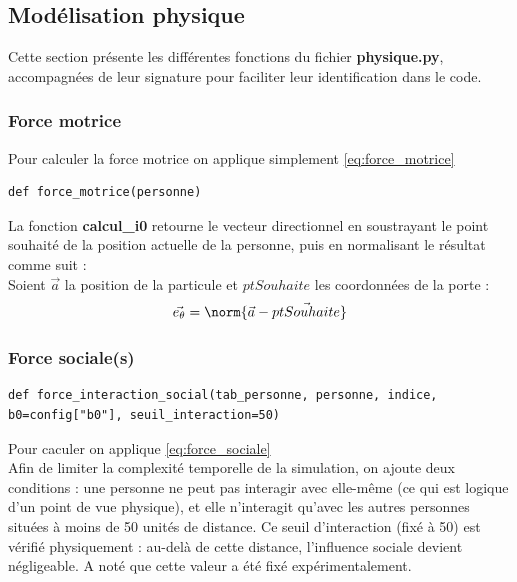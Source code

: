 \documentclass[a4paper,12pt]{article}
\begin{document}
\subsection{Modélisation physique}
Cette section présente les différentes fonctions du fichier \textbf{physique.py}, accompagnées de leur signature pour faciliter leur identification dans le code.
\subsubsection{Force motrice}

Pour calculer la force motrice on applique simplement \eqref{eq:force_motrice}

\begin{verbatim}
def force_motrice(personne)
\end{verbatim}

La fonction \textbf{calcul\_i0} retourne le vecteur directionnel en soustrayant le point souhaité de la position actuelle de la personne, puis en normalisant le résultat comme suit :
\\
\indent Soient $\vec{a}$ la position de la particule et $ptSouhaite$ les coordonnées de la porte :
\begin{equation}
	\vec{e_\theta} = \norm{\vec{a} - \vec{ptSouhaite}}
\end{equation}


\subsubsection{Force sociale(s)}


\begin{verbatim}
def force_interaction_social(tab_personne, personne, indice, b0=config["b0"], seuil_interaction=50)
\end{verbatim}

Pour caculer on applique \eqref{eq:force_sociale}
\\

Afin de limiter la complexité temporelle de la simulation, on ajoute deux conditions : une personne ne peut pas interagir avec elle-même (ce qui est logique d’un point de vue physique), et elle n’interagit qu’avec les autres personnes situées à moins de 50 unités de distance.  Ce seuil d’interaction (fixé à 50) est vérifié physiquement : au-delà de cette distance, l’influence sociale devient négligeable. A noté que cette valeur a été fixé expérimentalement.
\end{document}
